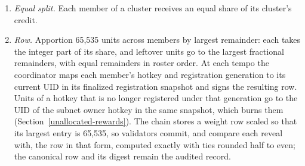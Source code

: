 \begin{enumerate}
group within one band. If the group occupies positions \(\mu_s\) to \(\mu_e\),
each of its clusters receives the mean of \(c(\kappa,\mu)\) over those
positions, so the roster order that lays out positions within a tie changes no
tied cluster's credit.
\item \emph{Equal split.} Each member of a cluster receives an equal share of
its cluster's credit.
\item \emph{Row.} Apportion 65,535 units across members by largest remainder:
each takes the integer part of its share, and leftover units go to the largest
fractional remainders, with equal remainders in roster order. At each tempo the
coordinator maps each member's hotkey and registration generation to its current
UID in its finalized registration snapshot and signs the resulting row. Units of
a hotkey that is no longer registered under that generation go to the UID of the
subnet owner hotkey in the same snapshot, which burns them
(Section~\ref{unallocated-rewards}). The chain stores
a weight row scaled so that its largest entry is 65,535, so validators commit,
and compare each reveal with, the row in that form, computed exactly with ties
rounded half to even; the canonical row and its digest remain the audited
record.
\end{enumerate}

